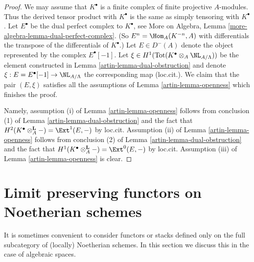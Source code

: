 \begin{proof}

We may assume that $K^\bullet$ is a finite complex of finite projective
$A$-modules. Thus the derived tensor product with $K^\bullet$ is the
same as simply tensoring with $K^\bullet$. Let
$E^\bullet$ be the dual perfect complex to $K^\bullet$, see
More on Algebra, Lemma \ref{more-algebra-lemma-dual-perfect-complex}.
(So $E^n = \Hom_A(K^{-n}, A)$ with differentials the transpose of the
differentials of $K^\bullet$.) Let $E \in D^{-}(A)$ denote the
object represented by the complex $E^\bullet[-1]$.
Let $\xi \in H^1(\text{Tot}(K^\bullet \otimes_A \NL_{A/\Lambda}))$
be the element constructed in Lemma \ref{artin-lemma-dual-obstruction}
and denote $\xi : E = E^\bullet[-1] \to \NL_{A/\Lambda}$ the corresponding
map (loc.cit.). We claim that the pair $(E, \xi)$ satisfies all the
assumptions of Lemma \ref{artin-lemma-openness} which finishes the proof.

\medskip\noindent
Namely, assumption (i) of Lemma \ref{artin-lemma-openness} follows from conclusion
(1) of Lemma \ref{artin-lemma-dual-obstruction}
and the fact that $H^2(K^\bullet \otimes_A^\mathbf{L} -) =
\Ext^1(E, -)$ by loc.cit. Assumption (ii) of
Lemma \ref{artin-lemma-openness} follows from conclusion (2) of
Lemma \ref{artin-lemma-dual-obstruction}
and the fact that $H^1(K^\bullet \otimes_A^\mathbf{L} -) =
\Ext^0(E, -)$ by loc.cit. Assumption (iii) of Lemma \ref{artin-lemma-openness}
is clear.
\end{proof}

\section{Limit preserving functors on Noetherian schemes}
\label{artin-section-noetherian}
It is sometimes convenient to consider functors or stacks defined only
on the full subcategory of (locally) Noetherian schemes. In this section
we discuss this in the case of algebraic spaces.

